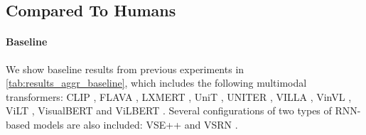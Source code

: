 \subsection{Compared To Humans}

\paragraph{Baseline}

We show baseline results from previous experiments \cite{thrush2022winoground} in \cref{tab:results_aggr_baseline}, which includes the following multimodal transformers: CLIP \cite{radford2021clip}, FLAVA \cite{singh2022flava}, LXMERT \cite{tan2020lxmert}, UniT \cite{hu2021unit}, UNITER \cite{chen2020uniter}, VILLA \cite{gan2020villa}, VinVL \cite{zhang2021vinvl}, ViLT \cite{kim2021vilt}, VisualBERT \cite{li2019visualbert} and ViLBERT \cite{lu2019vilbert}. Several configurations of two types of RNN-based models are also included: VSE++ \cite{faghri2018vse} and VSRN \cite{li2019vsrn}.

